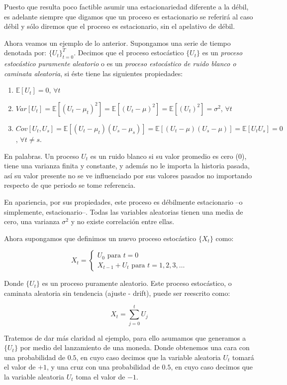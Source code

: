 \documentclass[
  a4paper,
]{article}
\begin{document}
Puesto que resulta poco factible asumir una estacionariedad diferente a
la débil, es adelante siempre que digamos que un proceso es estacionario
se referirá al caso débil y sólo diremos que el proceso es estacionario,
sin el apelativo de débil.

Ahora veamos un ejemplo de lo anterior. Supongamos una serie de tiempo
denotada por: \(\{U_t\}^T_{t = 0}\). Decimos que el proceso estocástico
\(\{U_t\}\) es un \textit{proceso estocástico puramente aleatorio} o es
un \textit{proceso estocástico de ruido blanco o caminata aleatoria}, si
éste tiene las siguientes propiedades:

\begin{enumerate}
\def\labelenumi{\arabic{enumi}.}
\item
  \(\mathbb{E}[U_t] = 0\), \(\forall t\)
\item
  \(Var[U_t] = \mathbb{E}[(U_t - \mu_t)^2] = \mathbb{E}[(U_t - \mu)^2] = \mathbb{E}[(U_t)^2] = \sigma^2\),
  \(\forall t\)
\item
  \(Cov[U_t,U_s] = \mathbb{E}[(U_t - \mu_t)(U_s - \mu_s)] = \mathbb{E}[(U_t - \mu)(U_s - \mu)] = \mathbb{E}[U_t U_s] = 0\),
  \(\forall t \neq s\).
\end{enumerate}

En palabras. Un proceso \(U_t\) es un ruido blanco si su valor promedio
es cero (0), tiene una varianza finita y constante, y además no le
importa la historia pasada, así su valor presente no se ve influenciado
por sus valores pasados no importando respecto de que periodo se tome
referencia.

En apariencia, por sus propiedades, este proceso es débilmente
estacionario --o simplemente, estacionario--. Todas las variables
aleatorias tienen una media de cero, una varianza \(\sigma^2\) y no
existe correlación entre ellas.

Ahora supongamos que definimos un nuevo proceso estocástico \(\{X_t\}\)
como:

\[
X_t = \left\{ \begin{array}{l} U_0  \mbox{ para } t = 0 \\ X_{t-1} + U_t \mbox{ para } t = 1, 2, 3, \ldots \end{array}\right.
\]

Donde \(\{ U_t \}\) es un proceso puramente aleatorio. Este proceso
estocástico, o caminata aleatoria sin tendencia (ajuste - drift), puede
ser reescrito como:

\[
X_t = \sum^t_{j = 0} U_j
\]

Tratemos de dar más claridad al ejemplo, para ello asumamos que
generamos a \(\{U_t\}\) por medio del lanzamiento de una moneda. Donde
obtenemos una cara con una probabilidad de \(0.5\), en cuyo caso decimos
que la variable aleatoria \(U_t\) tomará el valor de \(+1\), y una cruz
con una probabilidad de \(0.5\), en cuyo caso decimos que la variable
aleatoria \(U_t\) toma el valor de \(-1\).
\end{document}
